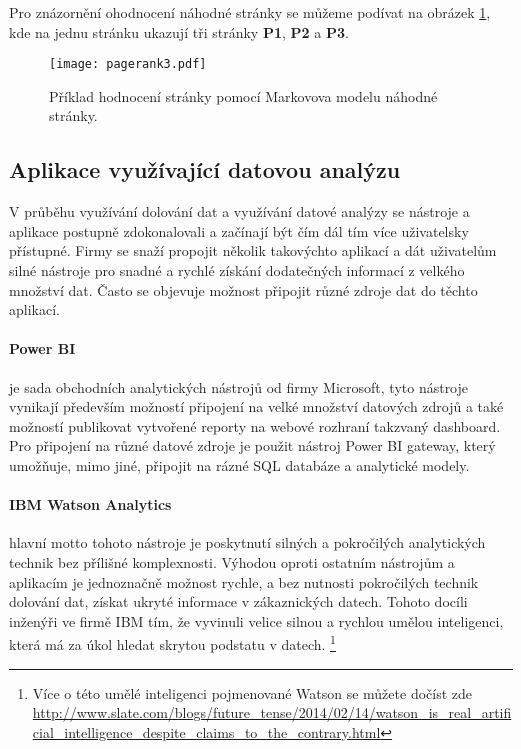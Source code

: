 \par Pro znázornění ohodnocení náhodné stránky se můžeme podívat na obrázek \ref{pageRankFig}, kde na jednu stránku ukazují tři stránky \textbf{P1}, \textbf{P2} a \textbf{P3}.
\begin{figure}[htp]
  \centering
  \texttt{[image: pagerank3.pdf]}
  \caption{Příklad hodnocení stránky pomocí Markovova modelu náhodné stránky.}
  \label{pageRankFig}
\end{figure}

\subsection{Aplikace využívající datovou analýzu}
\par V průběhu využívání dolování dat a využívání datové analýzy se nástroje a aplikace postupně zdokonalovali a začínají být čím dál tím více uživatelsky přístupné. Firmy se snaží propojit několik takovýchto aplikací a dát uživatelům silné nástroje pro snadné a rychlé získání dodatečných informací z velkého množství dat. Často se objevuje možnost připojit různé zdroje dat do těchto aplikací.

\paragraph{Power BI} je sada obchodních analytických nástrojů od firmy Microsoft, tyto nástroje vynikají především možností připojení na velké množství datových zdrojů a také možností publikovat vytvořené reporty na webové rozhraní takzvaný dashboard. Pro připojení na různé datové zdroje je použit nástroj Power BI gateway, který umožňuje, mimo jiné, připojit na rázné SQL databáze a analytické modely. \cite{powerbi}

\paragraph{IBM Watson Analytics} hlavní motto tohoto nástroje je poskytnutí silných a pokročilých analytických technik bez přílišné komplexnosti. Výhodou oproti ostatním nástrojům a aplikacím je jednoznačně možnost rychle, a bez nutnosti pokročilých technik dolování dat, získat ukryté informace v zákaznických datech. Tohoto docíli inženýři ve firmě IBM tím, že vyvinuli velice silnou a rychlou umělou inteligenci, která má za úkol hledat skrytou podstatu v datech. \footnote{Více o této umělé inteligenci pojmenované Watson se můžete dočíst zde \url{http://www.slate.com/blogs/future_tense/2014/02/14/watson_is_real_artificial_intelligence_despite_claims_to_the_contrary.html}} \cite{watson}

